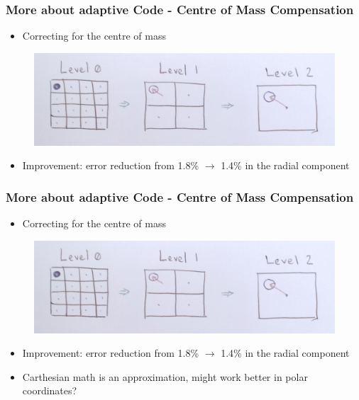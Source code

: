 \documentclass{beamer}
\begin{document}
\begin{frame}
 \frametitle{More about adaptive Code - Centre of Mass Compensation}
\begin{itemize}
  \item Correcting for the centre of mass
 \end{itemize}
 \begin{figure}[H]
  \centering
  \includegraphics[width=.7\textwidth]{../../../Sara/plots/COM_correction.png}     
\end{figure}
\begin{itemize}
  \item Improvement: error reduction from 1.8\% $\rightarrow$ 1.4\% in the radial component

 \end{itemize}
\end{frame}
\begin{frame}
 \frametitle{More about adaptive Code - Centre of Mass Compensation}
\begin{itemize}
  \item Correcting for the centre of mass
 \end{itemize}
 \begin{figure}[H]
  \centering
  \includegraphics[width=.7\textwidth]{../../../Sara/plots/COM_correction.png}     
\end{figure}
\begin{itemize}
  \item Improvement: error reduction from 1.8\% $\rightarrow$ 1.4\% in the radial component
  \item Carthesian math is an approximation, might work better in polar coordinates?
 \end{itemize}
\end{frame}
\end{document}
